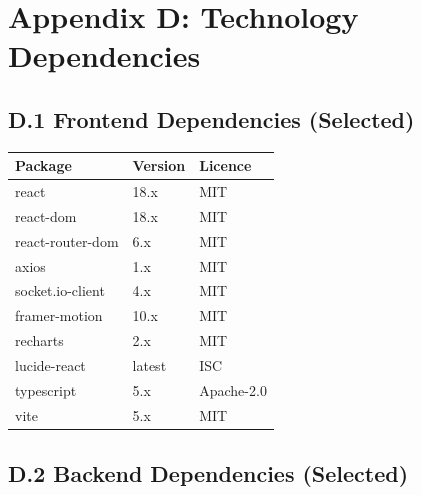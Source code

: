 \documentclass[
  12pt,
  a4paperpaper,
]{report}
\begin{document}
\section*{Appendix D: Technology
Dependencies}\label{appendix-d-technology-dependencies}

\subsection{D.1 Frontend Dependencies
(Selected)}\label{d.1-frontend-dependencies-selected}

\noindent\begin{tabularx}{\textwidth}{|p{4.5cm}|p{2.0cm}|X|}
\hline
\textbf{Package} & \textbf{Version} & \textbf{Licence} \\
\hline

react              & 18.x   & MIT \\[3pt]
\hline
react-dom          & 18.x   & MIT \\[3pt]
\hline
react-router-dom   & 6.x    & MIT \\[3pt]
\hline
axios              & 1.x    & MIT \\[3pt]
\hline
socket.io-client   & 4.x    & MIT \\[3pt]
\hline
framer-motion      & 10.x   & MIT \\[3pt]
\hline
recharts           & 2.x    & MIT \\[3pt]
\hline
lucide-react       & latest & ISC \\[3pt]
\hline
typescript         & 5.x    & Apache-2.0 \\[3pt]
\hline
vite               & 5.x    & MIT \\
\hline
\end{tabularx}

\subsection{D.2 Backend Dependencies
(Selected)}\label{d.2-backend-dependencies-selected}
\end{document}
